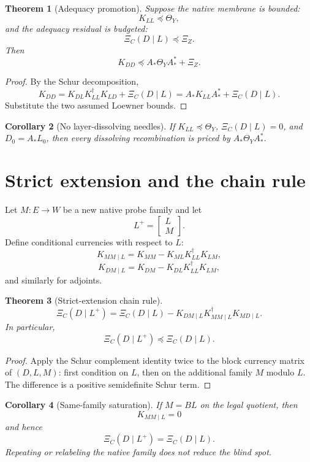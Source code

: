 \documentclass[11pt]{article}
\newtheorem{theorem}{Theorem}[section]
\newtheorem{corollary}[theorem]{Corollary}
\begin{document}
\begin{theorem}[Adequacy promotion]
Suppose the native membrane is bounded:
\[
K_{LL}\preceq\Theta_Y,
\]
and the adequacy residual is budgeted:
\[
\Xi_C(D\mid L)\preceq\Xi_Z.
\]
Then
\[
\boxed{
K_{DD}\preceq A_*\Theta_YA_*^*+\Xi_Z.
}
\]
\end{theorem}

\begin{proof}
By the Schur decomposition,
\[
K_{DD}=K_{DL}K_{LL}^{\dagger}K_{LD}+\Xi_C(D\mid L)=A_*K_{LL}A_*^*+\Xi_C(D\mid L).
\]
Substitute the two assumed Loewner bounds.
\end{proof}

\begin{corollary}[No layer-dissolving needles]
If \(K_{LL}\preceq\Theta_Y\), \(\Xi_C(D\mid L)=0\), and \(D_0=A_*L_0\), then every dissolving recombination is priced by \(A_*\Theta_YA_*^*\).
\end{corollary}

\section{Strict extension and the chain rule}

Let \(M:E\to W\) be a new native probe family and let
\[
L^+=\begin{bmatrix}L\\M\end{bmatrix}.
\]
Define conditional currencies with respect to \(L\):
\[
K_{MM\mid L}=K_{MM}-K_{ML}K_{LL}^{\dagger}K_{LM},
\]
\[
K_{DM\mid L}=K_{DM}-K_{DL}K_{LL}^{\dagger}K_{LM},
\]
and similarly for adjoints.

\begin{theorem}[Strict-extension chain rule]
\[
\boxed{
\Xi_C(D\mid L^+)
=
\Xi_C(D\mid L)-K_{DM\mid L}K_{MM\mid L}^{\dagger}K_{MD\mid L}.
}
\]
In particular,
\[
\boxed{
\Xi_C(D\mid L^+)\preceq\Xi_C(D\mid L).
}
\]
\end{theorem}

\begin{proof}
Apply the Schur complement identity twice to the block currency matrix of \((D,L,M)\): first condition on \(L\), then on the additional family \(M\) modulo \(L\).  The difference is a positive semidefinite Schur term.
\end{proof}

\begin{corollary}[Same-family saturation]
If \(M=BL\) on the legal quotient, then
\[
K_{MM\mid L}=0
\]
and hence
\[
\Xi_C(D\mid L^+)=\Xi_C(D\mid L).
\]
Repeating or relabeling the native family does not reduce the blind spot.
\end{corollary}
\end{document}
